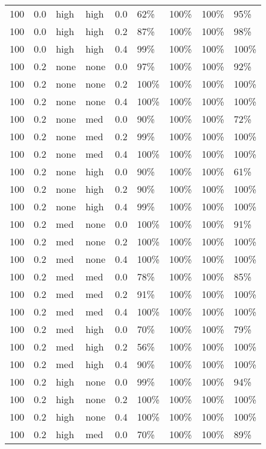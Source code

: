 \begin{longtable}{rrllrllll}
  100 & 0.0 & high & high & 0.0 & 62\% & 100\% & 100\% & 95\% \\ 
  100 & 0.0 & high & high & 0.2 & 87\% & 100\% & 100\% & 98\% \\ 
  100 & 0.0 & high & high & 0.4 & 99\% & 100\% & 100\% & 100\% \\ 
  100 & 0.2 & none & none & 0.0 & 97\% & 100\% & 100\% & 92\% \\ 
  100 & 0.2 & none & none & 0.2 & 100\% & 100\% & 100\% & 100\% \\ 
  100 & 0.2 & none & none & 0.4 & 100\% & 100\% & 100\% & 100\% \\ 
  100 & 0.2 & none & med & 0.0 & 90\% & 100\% & 100\% & 72\% \\ 
  100 & 0.2 & none & med & 0.2 & 99\% & 100\% & 100\% & 100\% \\ 
  100 & 0.2 & none & med & 0.4 & 100\% & 100\% & 100\% & 100\% \\ 
  100 & 0.2 & none & high & 0.0 & 90\% & 100\% & 100\% & 61\% \\ 
  100 & 0.2 & none & high & 0.2 & 90\% & 100\% & 100\% & 100\% \\ 
  100 & 0.2 & none & high & 0.4 & 99\% & 100\% & 100\% & 100\% \\ 
  100 & 0.2 & med & none & 0.0 & 100\% & 100\% & 100\% & 91\% \\ 
  100 & 0.2 & med & none & 0.2 & 100\% & 100\% & 100\% & 100\% \\ 
  100 & 0.2 & med & none & 0.4 & 100\% & 100\% & 100\% & 100\% \\ 
  100 & 0.2 & med & med & 0.0 & 78\% & 100\% & 100\% & 85\% \\ 
  100 & 0.2 & med & med & 0.2 & 91\% & 100\% & 100\% & 100\% \\ 
  100 & 0.2 & med & med & 0.4 & 100\% & 100\% & 100\% & 100\% \\ 
  100 & 0.2 & med & high & 0.0 & 70\% & 100\% & 100\% & 79\% \\ 
  100 & 0.2 & med & high & 0.2 & 56\% & 100\% & 100\% & 100\% \\ 
  100 & 0.2 & med & high & 0.4 & 90\% & 100\% & 100\% & 100\% \\ 
  100 & 0.2 & high & none & 0.0 & 99\% & 100\% & 100\% & 94\% \\ 
  100 & 0.2 & high & none & 0.2 & 100\% & 100\% & 100\% & 100\% \\ 
  100 & 0.2 & high & none & 0.4 & 100\% & 100\% & 100\% & 100\% \\ 
  100 & 0.2 & high & med & 0.0 & 70\% & 100\% & 100\% & 89\% \\ 

\end{longtable}
